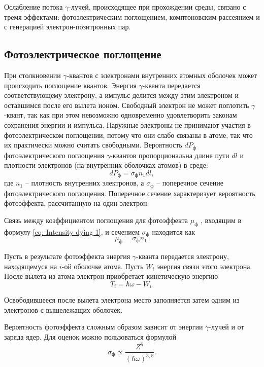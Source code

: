 \documentclass[a4paper,12pt]{article}
\begin{document}
Ослабление потока $\gamma$-лучей, происходящее при прохождении среды, связано с тремя эффектами: фотоэлектрическим поглощением, комптоновским рассеянием и с генерацией электрон-позитронных пар.

\subsection{Фотоэлектрическое поглощение}
При столкновении $\gamma$-квантов с электронами внутренних атомных оболочек может происходить поглощение квантов. Энергия $\gamma$-кванта передается соответствующему электрону, а импульс делится между этим электроном и оставшимся после его вылета ионом. Свободный электрон не может поглотить $\gamma$-квант, так как при этом невозможно одновременно удовлетворить законам сохранения энергии и импульса. Наружные электроны не принимают участия в фотоэлектрическом поглощении, потому что они слабо связаны в атоме, так что их практически можно считать свободными. Вероятность $dP_\text{ф}$ фотоэлектрического поглощения $\gamma$-квантов пропорциональна длине пути $dl$ и плотности электронов (на внутренних оболочках атомов) в среде:
\begin{equation}\label{eq: Photoelectric effect differential probability}
    dP_\text{ф} = \sigma_\text{ф}n_1dl,
\end{equation}
где $n_1$ -- плотность внутренних электронов, а $\sigma_\text{ф}$ -- поперечное сечение фотоэлектрического поглощения. Поперечное сечение характеризует вероятность фотоэффекта, рассчитанную на один электрон.

Связь между коэффициентом поглощения для фотоэффекта $\mu_\text{ф}$ , входящим в формулу \ref{eq: Intensity dying 1}, и сечением $\sigma_\text{ф}$ находится как
\begin{equation}\label{eq: Intensity dying coeff}
    \mu_\text{ф} = \sigma_\text{ф}n_1.
\end{equation}

Пусть в результате фотоэффекта энергия $\gamma$-кванта передается электрону, находящемуся на $i$-ой оболочке атома. Пусть $W_i$ энергия связи этого электрона. После вылета из атома электрон приобретает кинетическую энергию
\begin{equation}\label{eq: Electron kinetic energy}
    T_i = \hbar\omega - W_i.
\end{equation}

Освободившееся после вылета электрона место заполняется затем одним из электронов с вышележащих оболочек.

Вероятность фотоэффекта сложным образом зависит от энергии $\gamma$-лучей и от заряда ядер. Для оценок можно пользоваться формулой
\begin{equation}\label{eq: Photoelectric effect probability}
    \sigma_\text{ф} \propto \frac{Z^5}{(\hbar\omega)^{3,5}}.
\end{equation}
\end{document}
